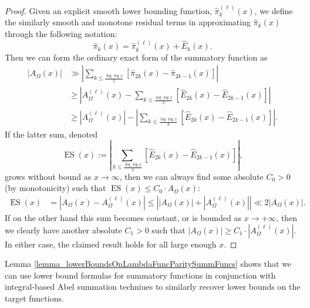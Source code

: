 \documentclass[11pt,reqno,a4letter]{article}
\numberwithin{figure}{section}
\numberwithin{table}{section}
\theoremstyle{plain}
\numberwithin{theorem}{section}
\theoremstyle{definition}
\begin{document}
\begin{proof} 
Given an explicit smooth lower bounding function, $\widehat{\pi}_k^{(\ell)}(x)$, we define the 
similarly smooth and monotone residual terms in approximating $\widehat{\pi}_k(x)$ 
through the following notation: 
\[
\widehat{\pi}_k(x) = \widehat{\pi}_k^{(\ell)}(x) + \widehat{E}_k(x). 
\]
Then we can form the ordinary exact form of the summatory function as 
\begin{align*} 
|A_{\Omega}(x)| & \gg \left\lvert \sum_{k \leq \frac{\log\log x}{2}} 
     \left[\widehat{\pi}_{2k}(x) - \widehat{\pi}_{2k-1}(x)\right] \right\rvert \\ 
     & \geq \left\lvert A_{\Omega}^{(\ell)}(x) - \sum_{k \leq \frac{\log\log x}{2}} 
     \left[\widehat{E}_{2k}(x) - \widehat{E}_{2k-1}(x)\right] 
     \right\rvert \\ 
     & \geq 
     \left\lvert A_{\Omega}^{(\ell)}(x) \right\rvert - 
     \left\lvert \sum_{k \leq \frac{\log\log x}{2}} 
     \left[\widehat{E}_{2k}(x) - \widehat{E}_{2k-1}(x)\right]
     \right\rvert. 
\end{align*} 
If the latter sum, denoted 
$$\operatorname{ES}(x) := \left\lvert \sum_{k \leq \frac{\log\log x}{2}} 
   \left[\widehat{E}_{2k}(x) - \widehat{E}_{2k-1}(x)\right] \right\rvert,$$ 
grows without bound as 
$x \rightarrow \infty$, then we can always find some absolute $C_0 > 0$ (by monotonicity) such that 
$\operatorname{ES}(x) \leq C_0 \cdot A_{\Omega}(x)$: 
\begin{align*} 
\operatorname{ES}(x) & = \left\lvert A_{\Omega}(x) - A_{\Omega}^{(\ell)}(x) \right\rvert 
     \leq \left\lvert |A_{\Omega}(x)| + 
     \left\lvert A_{\Omega}^{(\ell)}(x) \right\rvert \right\rvert 
     \ll 2 \left\lvert A_{\Omega}(x) \right\rvert. 
\end{align*} 
If on the other hand this sum becomes constant, or is bounded 
as $x \rightarrow +\infty$, then we clearly have another absolute $C_1 > 0$ such that 
$|A_{\Omega}(x)| \geq C_1 \cdot |A_{\Omega}^{(\ell)}(x)|$. 
In either case, the claimed result holds for all large enough $x$. 
\end{proof} 

Lemma \ref{lemma_lowerBoundsOnLambdaFuncParitySummFuncs} shows that we can use 
lower bound formulas for summatory functions in conjunction with integral-based 
Abel summation techniues to similarly recover lower bounds on the target 
functions. 
\end{document}

